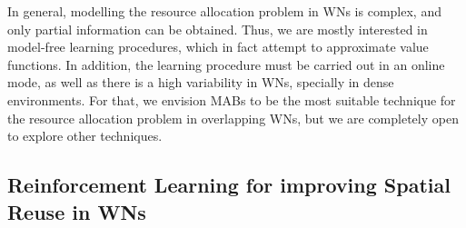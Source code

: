 \documentclass[12pt, a4paper,twoside]{tesi_upf}
\begin{document}
			In general, modelling the resource allocation problem in WNs is complex, and only partial information can be obtained. Thus, we are mostly interested in model-free learning procedures, which in fact attempt to approximate value functions. In addition, the learning procedure must be carried out in an online mode, as well as there is a high variability in WNs, specially in dense environments. For that, we envision MABs to be the most suitable technique for the resource allocation problem in overlapping WNs, but we are completely open to explore other techniques.
		
			\subsection{Reinforcement Learning for improving Spatial Reuse in WNs}		
			\label{tbl:rl_to_wns}
\end{document}
